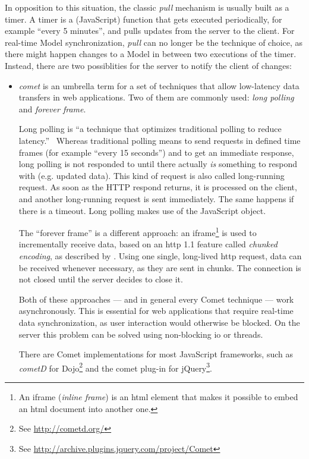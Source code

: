 In opposition to this situation, the classic \emph{pull} mechanism is usually built as a \gls{timer}. A timer is a (JavaScript) function that gets executed periodically, for example ``every 5 minutes'', and pulls updates from the server to the client. For real-time Model synchronization, \emph{pull} can no longer be the technique of choice, as there might happen changes to a Model in between two executions of the timer. Instead, there are two possiblities for the server to notify the client of changes:
\begin{itemize}
	\item \emph{\gls{comet}}\label{term:comet} is an umbrella term for a set of techniques that allow low-latency data transfers in web applications. Two of them are commonly used: \emph{long polling} and \emph{forever frame}.

	Long \gls{polling} is ``a technique that optimizes traditional polling to reduce latency.''~\cite{schiemann07b} Whereas traditional polling means to send requests in defined time frames (for example ``every 15 seconds'') and to get an immediate response, long polling is not responded to until there actually \emph{is} something to respond with (e.g. updated data). This kind of request is also called long-running request. As soon as the HTTP respond returns, it is processed on the client, and another long-running request is sent immediately. The same happens if there is a timeout. Long polling makes use of the  JavaScript object.

	The ``forever frame'' is a different approach: an iframe\footnote{An \gls{iframe} (\emph{inline frame}) is an \ac{html} element that makes it possible to embed an \ac{html} document into another one.} is used to incrementally receive data, based on an \ac{http} 1.1 feature called \emph{chunked encoding}, as described by . Using one single, long-lived \ac{http} request, data can be received whenever necessary, as they are sent in chunks. The connection is not closed until the server decides to close it.

	Both of these approaches --- and in general every Comet technique --- work asynchronously. This is essential for web applications that require real-time data synchronization, as user interaction would otherwise be blocked. On the server this problem can be solved using non-blocking \acs{io} or threads.

	There are Comet implementations for most JavaScript frameworks, such as \emph{cometD} for Dojo\footnote{See \url{http://cometd.org/}} and the comet plug-in for jQuery\footnote{See \url{http://archive.plugins.jquery.com/project/Comet}}.


\end{itemize}
